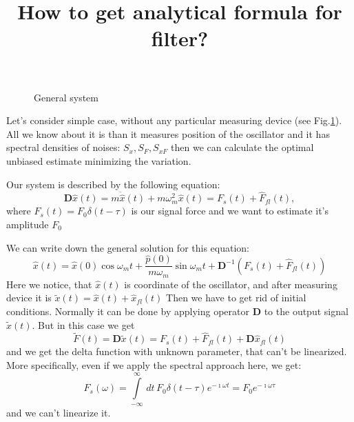\documentclass[notitlepage,a4paper,11pt,hyperref=pdftex]{revtex4-1}
\newcommand{\I}[2]{\int\limits_{#1}^{#2}\,}
\begin{document}
\title{How to get analytical formula for filter?}
\maketitle
\begin{figure}
\caption{General system}
\label{fig:meas}
\end{figure}

Let's consider simple case, without any particular measuring device (see Fig.\ref{fig:meas}). All we know about it is than it measures position of the oscillator and it has spectral densities of noises: $S_x,S_F, S_{xF}$
then we can calculate the optimal unbiased estimate minimizing the variation.

Our system is described by the following equation:
\begin{equation}
 \mathbf{D}\hat{x}(t) = m\ddot{\hat{x}}(t) + m \omega_m^2 \hat{x}(t) = F_s(t) + \hat{F}_{fl}(t), 
\end{equation}
where $F_s(t) = F_0\delta(t-\tau)$ is our signal force and we want to estimate it's amplitude $F_0$

We can write down the general solution for this equation:
\begin{equation}
 \hat{x}(t) = \hat{x}(0)\cos\omega_mt + \frac{\hat{p}(0)}{m\omega_m}\sin\omega_mt + \mathbf{D}^{-1}(F_s(t) + \hat{F}_{fl}(t))
\end{equation}
Here we notice, that $\hat{x}(t)$ is coordinate of the oscillator, and after measuring device it is $\tilde{x}(t) = \hat{x}(t)+\hat{x}_{fl}(t)$
Then we have to get rid of initial conditions. Normally it can be done by applying operator $\mathbf{D}$ to the output signal $\tilde{x}(t)$. But in this case we get 
\begin{equation}
 \tilde{F}(t) = \mathbf{D}\tilde{x}(t) = F_s(t) + \hat{F}_{fl}(t) + \mathbf{D}\hat{x}_{fl}(t)
\end{equation}
and we get the delta function with unknown parameter, that can't be linearized. More specifically, even if we apply the spectral approach here, we get:
\begin{equation}
 F_s(\omega) = \I{-\infty}{\infty}dt\,F_0\delta(t-\tau)e^{-\imath\omega t} = F_0 e^{-\imath\omega \tau}
\end{equation}
and we can't linearize it.
\end{document}

